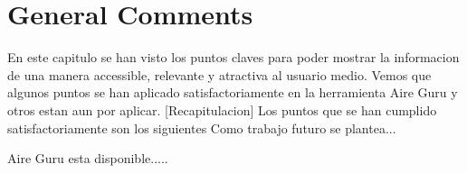 \section{General Comments}

En este capitulo se han visto los puntos claves para poder mostrar la informacion de una manera accessible,
relevante y atractiva al usuario medio. Vemos que algunos puntos se han aplicado satisfactoriamente en la herramienta
Aire Guru y otros estan aun por aplicar.
[Recapitulacion]
Los puntos que se han cumplido satisfactoriamente son los siguientes
Como trabajo futuro se plantea...

Aire Guru esta disponible.....